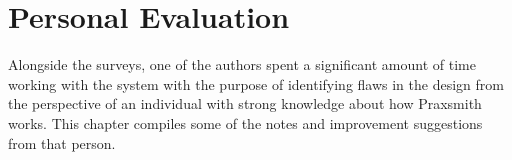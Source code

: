 \chapter{Personal Evaluation} \label{sec:PersonalEvaluation}

Alongside the surveys, one of the authors spent a significant amount of time working
with the system with the purpose of identifying flaws in the design from the
perspective of an individual with strong knowledge about how Praxsmith works. This
chapter compiles some of the notes and improvement suggestions from that person.
